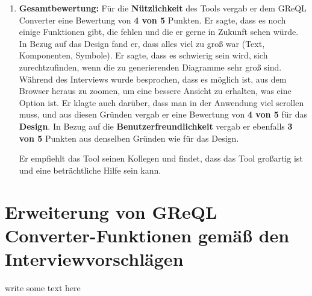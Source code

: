 \begin{enumerate}[itemsep=8pt, parsep=5pt]
    \item \textbf{Gesamtbewertung:}
    Für die \textbf{Nützlichkeit} des Tools vergab er dem GReQL Converter eine Bewertung von \textbf{4 von 5} Punkten.
    Er sagte, dass es noch einige Funktionen gibt, die fehlen und die er gerne in Zukunft sehen würde. In Bezug auf das
    Design fand er, dass alles viel zu groß war (Text, Komponenten, Symbole). Er sagte, dass es schwierig sein wird,
    sich zurechtzufinden, wenn die zu generierenden Diagramme sehr groß sind. Während des Interviews wurde besprochen,
    dass es möglich ist, aus dem Browser heraus zu zoomen, um eine bessere Ansicht zu erhalten, was eine Option ist.
    Er klagte auch darüber, dass man in der Anwendung viel scrollen muss, und aus diesen Gründen vergab er eine
    Bewertung von \textbf{4 von 5} für das \textbf{Design}. In Bezug auf die \textbf{Benutzerfreundlichkeit} vergab er
    ebenfalls \textbf{3 von 5} Punkten aus denselben Gründen wie für das Design.

    Er empfiehlt das Tool seinen Kollegen und findet, dass das Tool großartig ist und eine beträchtliche Hilfe sein
    kann.
\end{enumerate}



\section{Erweiterung von GReQL Converter-Funktionen gemäß den Interviewvorschlägen}
write some text here

